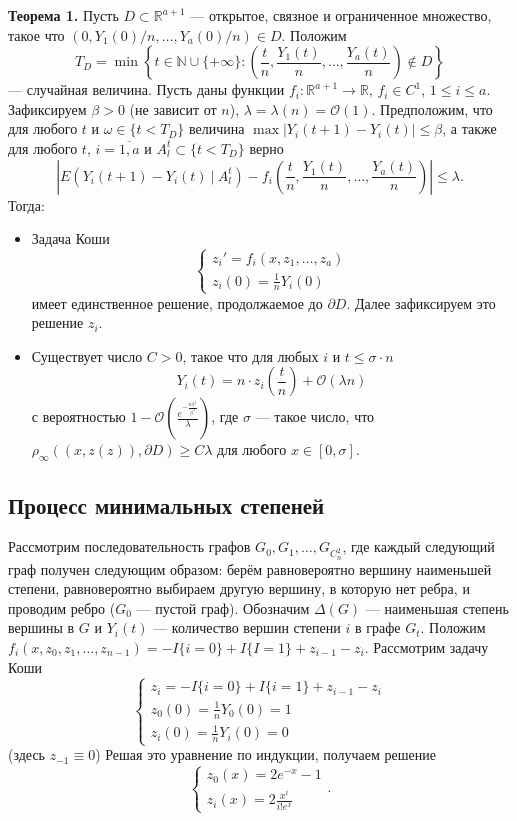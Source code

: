 \textbf{Теорема 1.} Пусть $D \subset \mathbb R^{a+1}$ --- открытое, связное и ограниченное множество, такое что $(0, Y_1(0)/n, \dots, Y_a(0)/n) \in D$.
Положим 
\[
    T_D = \min \left\{ t \in \mathbb N \cup \{+\infty\}: \left( \frac{t}{n}, \frac{Y_1(t)}{n}, \dots, \frac{Y_a(t)}{n} \right) \not\in D \right\}
\]
--- случайная величина.
Пусть даны функции $f_i: \mathbb R^{a+1} \to \mathbb R$, $f_i \in C^1$, $1 \le i \le a$.
Зафиксируем $\beta > 0$ (не зависит от $n$), $\lambda = \lambda(n) = \mathcal O(1)$.
Предположим, что для любого $t$ и $\omega \in \{t < T_D\}$ величина $\max |Y_i(t+1) - Y_i(t)| \le \beta$, а также для любого $t$, $i = \overline {1, a}$ и $A_l^t \subset \{t < T_D\}$ верно
\[
    \left| E(Y_i(t + 1) - Y_i(t)~|~A_l^t) - f_i \left(\frac{t}{n}, \frac{Y_1(t)}{n}, \dots, \frac{Y_a(t)}{n} \right) \right| \le \lambda.
\]
Тогда:
\begin{itemize}
    \item Задача Коши
        \[
            \begin{cases}
                z_i' = f_i(x, z_1, \dots, z_a) \\
                z_i(0) = \frac{1}{n} Y_i(0)
            \end{cases}
        \]
        имеет единственное решение, продолжаемое до $\partial D$.
        Далее зафиксируем это решение $z_i$.

    \item Существует число $C > 0$, такое что для любых $i$ и $t \le \sigma \cdot n$
        \[
            Y_i(t) = n \cdot z_i \left( \frac{t}{n} \right) + \mathcal O(\lambda n)
        \]
        с вероятностью $1 - \mathcal O \left(\frac{e^{-\frac{n \lambda^3}{\beta^3}}}{\lambda} \right)$, где $\sigma$ --- такое число, что $\rho_{\infty}((x, z(z)), \partial D) \ge C\lambda$ для любого $x \in [0, \sigma]$.
\end{itemize}

\subsection{Процесс минимальных степеней}
Рассмотрим последовательность графов $G_0, G_1, \dots, G_{C_n^2}$, где каждый следующий граф получен следующим образом: берём равновероятно вершину наименьшей степени, равновероятно выбираем другую вершину, в которую нет ребра, и проводим ребро ($G_0$ --- пустой граф).
Обозначим $\Delta(G)$ --- наименьшая степень вершины в $G$ и $Y_i(t)$ --- количество вершин степени $i$ в графе $G_t$.
Положим $f_i(x, z_0, z_1, \dots, z_{n-1}) = -I\{i = 0\} + I\{I = 1\} + z_{i-1} - z_i$.
Рассмотрим задачу Коши
\[
    \begin{cases}
        z_i = -I\{i = 0\} + I\{i = 1\} + z_{i-1} - z_i \\
        z_0(0) = \frac{1}{n} Y_0(0) = 1 \\
        z_i(0) = \frac{1}{n} Y_i(0) = 0
    \end{cases}
\]
(здесь $z_{-1} \equiv 0$)
Решая это уравнение по индукции, получаем решение
\[
    \begin{cases}
        z_0(x) = 2e^{-x} - 1 \\
        z_i(x) = 2 \frac{x^i}{i! e^x}
    \end{cases}.
\]


